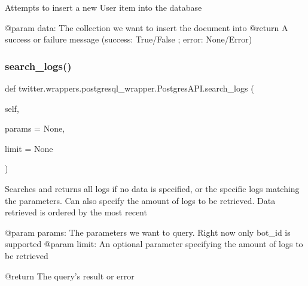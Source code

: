 \begin{DoxyVerb}Attempts to insert a new User item into the database

@param data: The collection we want to insert the document into
@return A success or failure message ({success: True/False ; error: None/Error})
\end{DoxyVerb}
 \mbox{\label{classtwitter_1_1wrappers_1_1postgresql__wrapper_1_1PostgresAPI_a85bdfe473c1bd0bd29e11c059e7cb3dc}} 
\subsubsection{\texorpdfstring{search\+\_\+logs()}{search\_logs()}}
{\footnotesize\ttfamily def twitter.\+wrappers.\+postgresql\+\_\+wrapper.\+Postgres\+A\+P\+I.\+search\+\_\+logs (\begin{DoxyParamCaption}\item[{}]{self,  }\item[{}]{params = {\ttfamily None},  }\item[{}]{limit = {\ttfamily None} }\end{DoxyParamCaption})}

\begin{DoxyVerb}Searches and returns all logs if no data is specified, or the specific logs matching the parameters. Can also
specify the amount of logs to be retrieved. Data retrieved is ordered by the most recent

@param params: The parameters we want to query. Right now only bot_id is supported
@param limit: An optional parameter specifying the amount of logs to be retrieved

@return The query's result or error
\end{DoxyVerb}
 \mbox{\label{classtwitter_1_1wrappers_1_1postgresql__wrapper_1_1PostgresAPI_aeac23865a14e4f32e90cb7daa4a03e2b}} 

